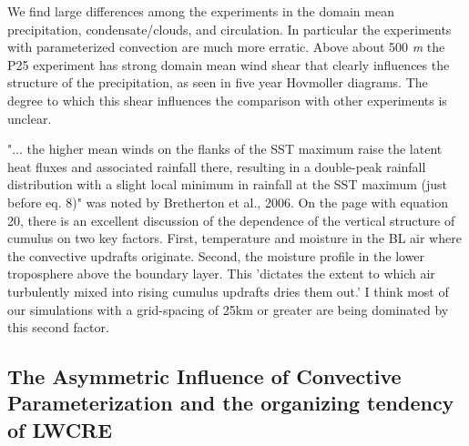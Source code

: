 \documentclass[11pt]{article}   	%
\begin{document}
We find large differences among the experiments in the domain mean precipitation, condensate/clouds, and circulation.  In particular
the experiments with parameterized convection are much more erratic.  Above about 500 \textit{m} the P25 experiment
has strong domain mean wind shear that clearly influences the structure of the precipitation, as seen in 
five year Hovmoller diagrams.  The degree to which this shear influences the comparison with other experiments is unclear.    

"... the higher mean winds on the flanks of the SST maximum raise the latent heat fluxes and associated rainfall there, resulting in a 
double-peak rainfall distribution with a slight local minimum in rainfall at the SST maximum (just before eq. 8)" 
was noted by Bretherton et al., 2006.  On the page with equation 20, there is an excellent discussion of the dependence of the 
vertical structure of cumulus on two key factors.  First, temperature and moisture in the BL air where the convective updrafts originate.
Second, the moisture profile in the lower troposphere above the boundary layer.  This 'dictates the extent to which air
turbulently mixed into rising cumulus updrafts dries them out.'  I think most of our simulations with a grid-spacing of 25km or 
greater are being dominated by this second factor.    

\subsection{The Asymmetric Influence of Convective Parameterization and the organizing tendency of LWCRE}


\end{document}
